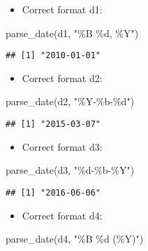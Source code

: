 \documentclass[
]{article}
\newenvironment{Shaded}{\begin{snugshade}}{\end{snugshade}}
\newcommand{\FunctionTok}[1]{\textcolor[rgb]{0.00,0.00,0.00}{#1}}
\newcommand{\NormalTok}[1]{#1}
\newcommand{\StringTok}[1]{\textcolor[rgb]{0.31,0.60,0.02}{#1}}
\providecommand{\tightlist}{%
  \setlength{\itemsep}{0pt}\setlength{\parskip}{0pt}}
\begin{document}
\begin{itemize}
\tightlist
\item
  Correct format d1:
\end{itemize}

\begin{Shaded}
\begin{Highlighting}[]
\FunctionTok{parse\_date}\NormalTok{(d1, }\StringTok{"\%B \%d, \%Y"}\NormalTok{)}
\end{Highlighting}
\end{Shaded}

\begin{verbatim}
## [1] "2010-01-01"
\end{verbatim}

\begin{itemize}
\tightlist
\item
  Correct format d2:
\end{itemize}

\begin{Shaded}
\begin{Highlighting}[]
\FunctionTok{parse\_date}\NormalTok{(d2, }\StringTok{"\%Y{-}\%b{-}\%d"}\NormalTok{)}
\end{Highlighting}
\end{Shaded}

\begin{verbatim}
## [1] "2015-03-07"
\end{verbatim}

\begin{itemize}
\tightlist
\item
  Correct format d3:
\end{itemize}

\begin{Shaded}
\begin{Highlighting}[]
\FunctionTok{parse\_date}\NormalTok{(d3, }\StringTok{"\%d{-}\%b{-}\%Y"}\NormalTok{)}
\end{Highlighting}
\end{Shaded}

\begin{verbatim}
## [1] "2016-06-06"
\end{verbatim}

\begin{itemize}
\tightlist
\item
  Correct format d4:
\end{itemize}

\begin{Shaded}
\begin{Highlighting}[]
\FunctionTok{parse\_date}\NormalTok{(d4, }\StringTok{"\%B \%d (\%Y)"}\NormalTok{)}
\end{Highlighting}
\end{Shaded}
\end{document}
